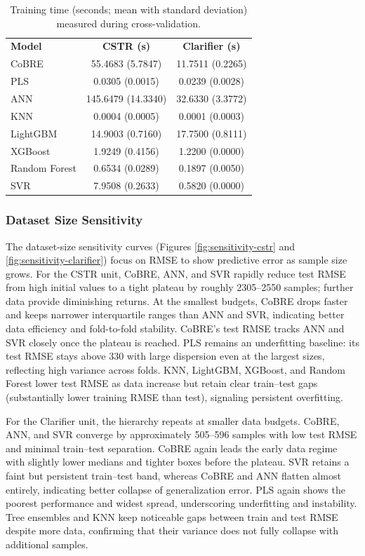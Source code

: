 \documentclass{article}
\begin{document}
\begin{table}[h]
\centering
\scriptsize
\begin{tabular}{lcc}
\textbf{Model} & \textbf{CSTR (s)} & \textbf{Clarifier (s)} \\
CoBRE & 55.4683 (5.7847) & 11.7511 (0.2265) \\
PLS & 0.0305 (0.0015) & 0.0239 (0.0028) \\
ANN & 145.6479 (14.3340) & 32.6330 (3.3772) \\
KNN & 0.0004 (0.0005) & 0.0001 (0.0003) \\
LightGBM & 14.9003 (0.7160) & 17.7500 (0.8111) \\
XGBoost & 1.9249 (0.4156) & 1.2200 (0.0000) \\
Random Forest & 0.6534 (0.0289) & 0.1897 (0.0050) \\
SVR & 7.9508 (0.2633) & 0.5820 (0.0000) \\
\end{tabular}
\caption{Training time (seconds; mean with standard deviation) measured during cross-validation.}
\label{tab:train-time}
\end{table}

\subsubsection{Dataset Size Sensitivity}

The dataset-size sensitivity curves (Figures \ref{fig:sensitivity-cstr} and \ref{fig:sensitivity-clarifier}) focus on RMSE to show predictive error as sample size grows. For the CSTR unit, CoBRE, ANN, and SVR rapidly reduce test RMSE from high initial values to a tight plateau by roughly 2305--2550 samples; further data provide diminishing returns. At the smallest budgets, CoBRE drops faster and keeps narrower interquartile ranges than ANN and SVR, indicating better data efficiency and fold-to-fold stability. CoBRE's test RMSE tracks ANN and SVR closely once the plateau is reached. PLS remains an underfitting baseline: its test RMSE stays above 330 with large dispersion even at the largest sizes, reflecting high variance across folds. KNN, LightGBM, XGBoost, and Random Forest lower test RMSE as data increase but retain clear train--test gaps (substantially lower training RMSE than test), signaling persistent overfitting.

For the Clarifier unit, the hierarchy repeats at smaller data budgets. CoBRE, ANN, and SVR converge by approximately 505--596 samples with low test RMSE and minimal train--test separation. CoBRE again leads the early data regime with slightly lower medians and tighter boxes before the plateau. SVR retains a faint but persistent train--test band, whereas CoBRE and ANN flatten almost entirely, indicating better collapse of generalization error. PLS again shows the poorest performance and widest spread, underscoring underfitting and instability. Tree ensembles and KNN keep noticeable gaps between train and test RMSE despite more data, confirming that their variance does not fully collapse with additional samples.
\end{document}

